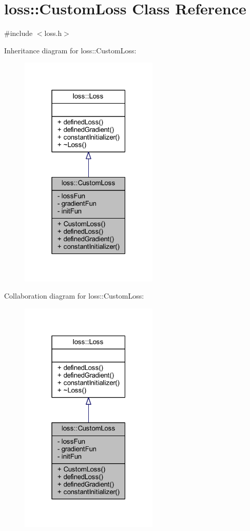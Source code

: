 \hypertarget{classloss_1_1_custom_loss}{}\section{loss\+:\+:Custom\+Loss Class Reference}
\label{classloss_1_1_custom_loss}


{\ttfamily \#include $<$loss.\+h$>$}



Inheritance diagram for loss\+:\+:Custom\+Loss\+:\nopagebreak
\begin{figure}[H]
\begin{center}
\leavevmode
\includegraphics[width=187pt]{classloss_1_1_custom_loss__inherit__graph}
\end{center}
\end{figure}


Collaboration diagram for loss\+:\+:Custom\+Loss\+:\nopagebreak
\begin{figure}[H]
\begin{center}
\leavevmode
\includegraphics[width=187pt]{classloss_1_1_custom_loss__coll__graph}
\end{center}
\end{figure}

